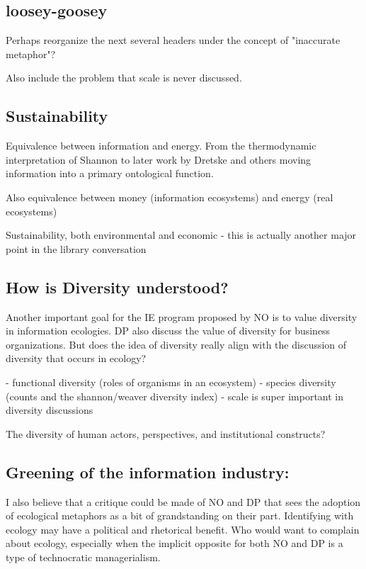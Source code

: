 \subsection{loosey-goosey}

Perhaps reorganize the next several headers under the concept of "inaccurate metaphor"?
 
 Also include the problem that scale is never discussed.

\subsection{Sustainability}

Equivalence between information and energy. From the thermodynamic interpretation of Shannon to later work by Dretske and others moving information into a primary ontological function.

Also equivalence between money (information ecosystems) and energy (real ecosystems)

Sustainability, both environmental and economic - this is actually another major point in the library conversation

\subsection{How is Diversity understood?}

Another important goal for the IE program proposed by NO is to value diversity in information ecologies. DP also discuss the value of diversity for business organizations. But does the idea of diversity really align with the discussion of diversity that occurs in ecology?

- functional diversity (roles of organisms in an ecosystem)
- species diversity (counts and the shannon/weaver diversity index)
- scale is super important in diversity discussions

The diversity of human actors, perspectives, and institutional constructs?

\subsection{Greening of the information industry:}

I also believe that a critique could be made of NO and DP that sees the adoption of ecological metaphors as a bit of grandstanding on their part. Identifying with ecology may have a political and rhetorical benefit. Who would want to complain about ecology, especially when the implicit opposite for both NO and DP is a type of technocratic managerialism.

